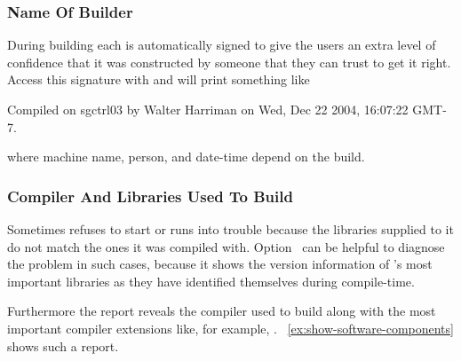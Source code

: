\subsubsection[Builder]{\label{sec:name-of-builder}%
  Name Of Builder}

During building each \appcmd{} is automatically signed to give the users an extra level of
confidence that it was constructed by someone that they can trust to get it right.  Access this
signature with  and \appcmd{} will print something like

\begin{literal}
  Compiled on sgctrl03 by Walter Harriman on Wed, Dec 22 2004, 16:07:22 GMT-7.
\end{literal}

\noindent where machine name, person, and date-time depend on the
build.


\subsubsection[Compiler And Libraries]{\label{sec:compiler-and-libraries}%
  Compiler And Libraries Used To Build}

Sometimes \appcmd{} refuses to start or runs into trouble because the libraries supplied to it
do not match the ones it was compiled with.  Option~ can be
helpful to diagnose the problem in such cases, because it shows the version information of
\App's most important libraries as they have identified themselves during compile-time.

Furthermore the report reveals the compiler used to build \appcmd{} along with the most
important compiler extensions like, for example,
.
\exampleName~\ref{ex:show-software-components} shows such a report.

